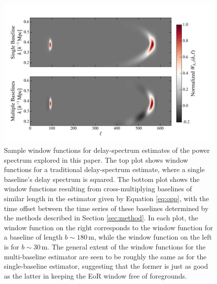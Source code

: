 \documentclass[twocolumn,apj,numberedappendix]{emulateapj}
\renewcommand\[{\begin{equation}}
\renewcommand\]{\end{equation}}
\begin{document}
\begin{figure}[h!]
\includegraphics[width=1.0\textwidth]{multiblwindows.png}
\caption{Sample window functions for delay-spectrum estimates of the power spectrum explored in this paper. The top plot shows window functions for a traditional delay-spectrum estimate, where a single baseline's delay spectrum is squared. The bottom plot shows the window functions resulting from cross-multiplying baselines of similar length in the estimator given by Equation \eqref{eq:opp}, with the time offset between the time series of these baselines determined by the methods described in Section \ref{sec:method}. In each plot, the window function on the right corresponds to the window function for a baseline of length $b \sim 180\,\textrm{m}$, while the window function on the left is for $b\sim 30\,\textrm{m}$. The general extent of the window functions for the multi-baseline estimator are seen to be roughly the same as for the single-baseline estimator, suggesting that the former is just as good as the latter in keeping the EoR window free of foregrounds.}
\label{fig:multiblwindows}
\end{figure}
\end{document}
